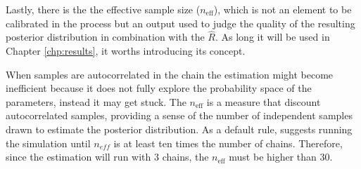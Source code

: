 Lastly, there is the the effective sample size ($n_{\text{eff}}$), which is not an element to be calibrated in the process but an output used to judge the quality of the resulting posterior distribution in combination with the $\hat{R}$. As long it will be used in Chapter \ref{chp:results}, it worths introducing its concept. 

When samples are autocorrelated in the chain the estimation might become inefficient because it does not fully explore the probability space of the parameters, instead it may get stuck. The $n_{\text{eff}}$ is a measure that discount autocorrelated samples, providing a sense of the number of independent samples drawn to estimate the posterior distribution. As a default rule, \cite{gelman2014} suggests running the simulation until $n_{eff}$ is at least ten times the number of chains. Therefore, since the estimation will run with 3 chains, the $n_{\text{eff}}$ must be higher than 30.